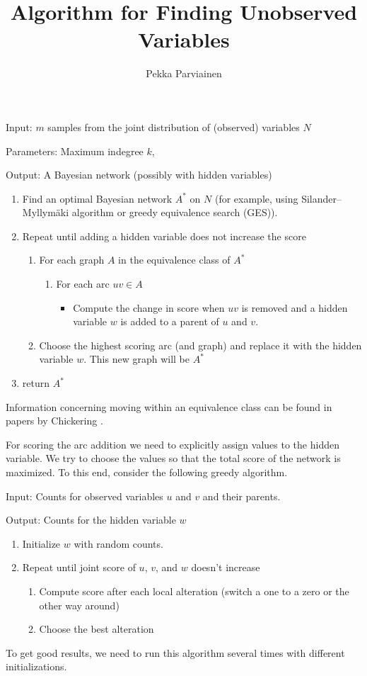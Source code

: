 \documentclass[10pt]{article}
\title{Algorithm for Finding Unobserved Variables}
\author{Pekka Parviainen}
\begin{document}
\maketitle

Input: $m$ samples from the joint distribution of (observed) variables $N$

Parameters: Maximum indegree $k$, 

Output: A Bayesian network (possibly with hidden variables)

\begin{enumerate}
\item Find an optimal Bayesian network $A^*$ on $N$ (for example, using Silander--Myllym\"aki algorithm or greedy equivalence search (GES)).
\item Repeat until adding a hidden variable does not increase the score
\begin{enumerate}
\item For each graph $A$ in the equivalence class of $A^*$
\begin{enumerate}
\item For each arc $uv\in A$
\begin{itemize}
\item Compute the change in score when $uv$ is removed and a hidden variable $w$ is added to a parent of $u$ and $v$.
\end{itemize}
\end{enumerate}
\item Choose the highest scoring arc (and graph) and replace it with the hidden variable $w$. This new graph will be $A^*$
\end{enumerate}
\item return $A^*$

\end{enumerate}

Information concerning moving within an equivalence class can be found in papers by Chickering \cite{chickering95, chickering02b, chickering02c}.

For scoring the arc addition we need to explicitly assign values to the hidden variable. We try to choose the values so that the total score of the network is maximized. To this end, consider the following greedy algorithm.

Input: Counts for observed variables $u$ and $v$ and their parents.

Output: Counts for the hidden variable $w$

\begin{enumerate}
\item Initialize $w$ with random counts.
\item Repeat until joint score of $u$, $v$, and $w$ doesn't increase
\begin{enumerate}
\item Compute score after each local alteration (switch a one to a zero or the other way around)
\item Choose the best alteration 
\end{enumerate}
\end{enumerate}

To get good results, we need to run this algorithm several times with different initializations.



\end{document}
